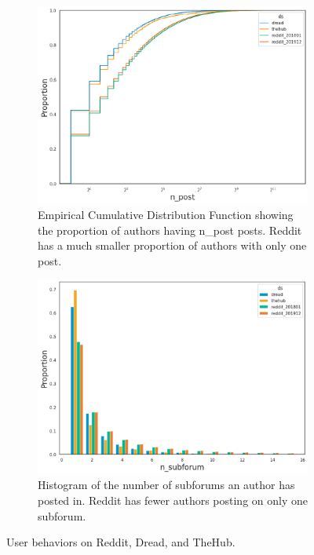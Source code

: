 \begin{figure}
    \begin{subfigure}{0.75\linewidth}
        \centering
        \includegraphics[width=\textwidth]{stylometryExtensions/figures/RedditPostCDF}
        \caption{Empirical Cumulative Distribution Function showing the proportion of authors having n\_post posts. Reddit has a much smaller proportion of authors with only one post.}
        \label{fig:stylometry_extensions:followingTrail:datasets:behaviors:posts}
    \end{subfigure}
    \begin{subfigure}{0.75\linewidth}
        \centering
        \includegraphics[width=\textwidth]{stylometryExtensions/figures/RedditSubforumCounts}
        \caption{Histogram of the number of subforums an author has posted in. Reddit has fewer authors posting on only one subforum.}
        \label{fig:stylometry_extensions:followingTrail:datasets:behaviors:subforums}
    \end{subfigure}
    \caption{User behaviors on Reddit, Dread, and TheHub.}
    \label{fig:stylometry_extensions:followingTrail:datasets:behaviors}
\end{figure}

